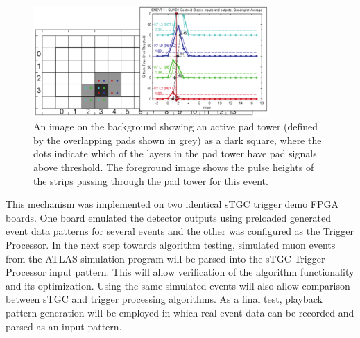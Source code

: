 \begin{figure}[h]
   \centering
   \includegraphics[width=0.8\textwidth]{figures/JN_TGCevgen_V01.pdf}
   \caption{An image on the background showing an active pad tower (defined by the overlapping pads shown in grey) as a dark square,
   where the dots indicate which of the layers in the pad tower have pad signals above threshold.
   The foreground image shows the pulse heights of the strips passing through the pad tower for this event.}
   \label{fig:TGCevgen}
\end{figure}

This mechanism was implemented on two identical sTGC trigger demo FPGA boards.
One board emulated the detector outputs using preloaded generated event data patterns for several events and the other was configured as the Trigger Processor.
In the next step towards algorithm testing,
simulated muon events from the ATLAS simulation program will be parsed into the sTGC Trigger Processor input pattern.
This will allow verification of the algorithm functionality and its optimization.
Using the same simulated events will also allow comparison between sTGC and \MM trigger processing algorithms.
As a final test, playback pattern generation will be employed in which real event data can be recorded and parsed as an input pattern.

\FloatBarrier


